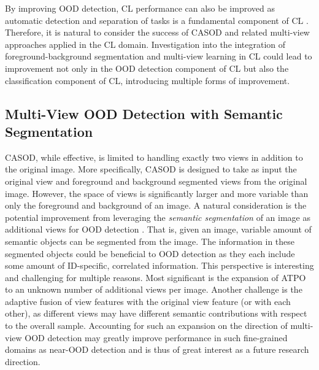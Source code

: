 
By improving OOD detection, CL performance can also be improved as automatic detection and separation of tasks is a fundamental component of CL \cite{kim2022theoretical}. Therefore, it is natural to consider the success of CASOD and related multi-view approaches applied in the CL domain. Investigation into the integration of foreground-background segmentation and multi-view learning in CL could lead to improvement not only in the OOD detection component of CL but also the classification component of CL, introducing multiple forms of improvement. 

\subsection{Multi-View OOD Detection with Semantic Segmentation}
\label{sec:future_work-semseg}

CASOD, while effective, is limited to handling exactly two views in addition to the original image. More specifically, CASOD is designed to take as input the original view and foreground and background segmented views from the original image. However, the space of views is significantly larger and more variable than only the foreground and background of an image. A natural consideration is the potential improvement from leveraging the \textit{semantic segmentation} of an image as additional views for OOD detection \cite{guo2018review}. That is, given an image, variable amount of semantic objects can be segmented from the image. The information in these segmented objects could be beneficial to OOD detection as they each include some amount of ID-specific, correlated information. This perspective is interesting and challenging for multiple reasons. Most significant is the expansion of ATPO to an unknown number of additional views per image. Another challenge is the adaptive fusion of view features with the original view feature (or with each other), as different views may have different semantic contributions with respect to the overall sample. Accounting for such an expansion on the direction of multi-view OOD detection may greatly improve performance in such fine-grained domains as near-OOD detection and is thus of great interest as a future research direction.

